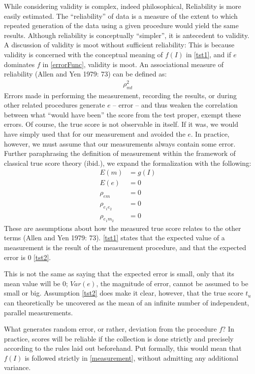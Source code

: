 \documentclass[12pt,twoside]{reedthesis}
\begin{document}
While considering validity is complex, indeed philosophical, Reliability
is more easily estimated. The ``reliability'' of data is a measure of
the extent to which repeated generation of the data using a given
procedure would yield the same results. Although reliability is
conceptually ``simpler'', it is antecedent to validity. A discussion of
validity is moot without sufficient reliability: This is because
validity is concerned with the conceptual meaning of \(f(I)\) in
\ref{tst1}, and if \(e\) dominates \(f\) in \ref{errorFunc}, validity is
moot. An associational measure of reliability (Allen and Yen 1979: 73)
can be defined as:
\begin{align}
\rho^2_{mt} \label{rel1}
\end{align}
Errors made in performing the measurement, recording the results, or
during other related procedures generate \(e\) -- error -- and thus
weaken the correlation between what ``would have been'' the score from
the test proper, exempt these errors. Of course, the true score is not
observable in itself. If it was, we would have simply used that for our
measurement and avoided the \(e\). In practice, however, we must assume
that our measurements always contain some error. Further paraphrasing
the definition of measurement within the framework of classical true
score theory (ibid.), we expand the formalization with the following:
\begin{align}
E(m) &= g(I) \label{tst1}\\
E(e) &= 0 \label{tst2}\\
\rho_{em} &= 0 \label{tst3}\\
\rho_{e_1e_2} &= 0 \label{tst4}\\
\rho_{e_1m_2} &= 0 \label{tst5}
\end{align}
These are assumptions about how the measured true score relates to the
other terms (Allen and Yen 1979: 73). \ref{tst1} states that the
expected value of a measurement is the result of the measurement
procedure, and that the expected error is 0 \ref{tst2}.

This is not the same as saying that the expected error is small, only
that its mean value will be 0; \(Var(e)\), the magnitude of error,
cannot be assumed to be small or big. Assumption \ref{tst2} does make it
clear, however, that the true score \(t_u\) can theoretically be
uncovered as the mean of an infinite number of independent, parallel
measurements.

What generates random error, or rather, deviation from the procedure
\(f\)? In practice, scores will be reliable if the collection is done
strictly and precisely according to the rules laid out beforehand. Put
formally, this would mean that \(f(I)\) is followed strictly in
\ref{measurement}, without admitting any additional variance.
\end{document}
